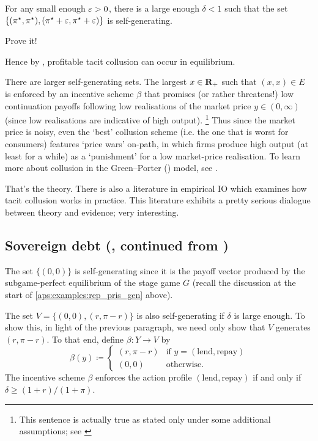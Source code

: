 For any small enough $\varepsilon>0$, there is a large enough $\delta<1$ such that the set $\{ (\pi^\star,\pi^\star), (\pi^\star+\varepsilon,\pi^\star+\varepsilon) \}$ is self-generating.

\begin{exercise}
	\label{exercise:greenporter_gen}
	Prove it!
\end{exercise}

\noindent
Hence by , profitable tacit collusion can occur in equilibrium.

There are larger self-generating sets. The largest $x \in \mathbf{R}_+$ such that $(x,x) \in E$ is enforced by an incentive scheme $\beta$ that promises (or rather threatens!) low continuation payoffs following low realisations of the market price $y \in (0,\infty)$ (since low realisations are indicative of high output).%
	\footnote{This sentence is actually true as stated only under some additional assumptions; see \textcite[][section~11.1.3]{MailathSamuelson2006}}
Thus since the market price is noisy, even the `best' collusion scheme (i.e. the one that is worst for consumers) features `price wars' on-path, in which firms produce high output (at least for a while) as a `punishment' for a low market-price realisation. To learn more about collusion in the Green--Porter (\citeyear{GreenPorter1984}) model, see \textcite[][section~11.1]{MailathSamuelson2006}.

That's the theory. There is also a literature in empirical IO which examines how tacit collusion works in practice. This literature exhibits a pretty serious dialogue between theory and evidence; very interesting.



\subsection{\texorpdfstring{Sovereign debt (, continued from )}{Sovereign debt (Example \ref{example:sovereign}, continued from p. \pageref{example:sovereign})}}
\label{aps:examples:sovereign_gen}

The set $\{ (0,0) \}$ is self-generating since it is the payoff vector produced by the subgame-perfect equilibrium of the stage game $G$ (recall the discussion at the start of \cref{aps:examples:rep_pris_gen} above).

The set $V = \{ (0,0), (r,\pi-r) \}$ is also self-generating if $\delta$ is large enough. To show this, in light of the previous paragraph, we need only show that $V$ generates $(r,\pi-r)$. To that end, define $\beta : Y \to V$ by
%
\begin{equation*}
	\beta(y) \coloneqq
	\begin{cases}
		(r,\pi-r) & \text{if $y = (\text{lend},\text{repay})$} \\
		(0,0) & \text{otherwise.}
	\end{cases}
\end{equation*}
%
The incentive scheme $\beta$ enforces the action profile $(\text{lend},\text{repay})$ if and only if $\delta \geq (1+r)/(1+\pi)$.

